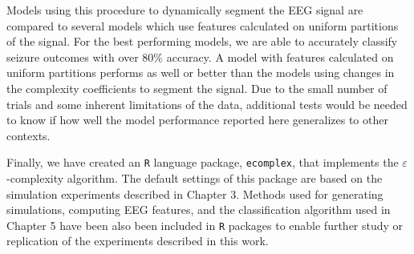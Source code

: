 Models using this procedure to dynamically segment the EEG signal
are compared to several models which use features calculated on uniform partitions of the signal. 
For the best performing models, we are able to accurately classify 
seizure outcomes with over 80\% accuracy. A model with features calculated on uniform partitions performs 
as well or better than the models using changes in the complexity
coefficients to segment the signal.
Due to the small number of trials and some inherent limitations 
of the data, additional tests would be needed to 
know if how well the model performance reported here generalizes
to other contexts.


Finally, we have created an \texttt{R} language package, 
\texttt{ecomplex}, that implements 
the $\varepsilon$-complexity algorithm. The 
default settings of this package are based on the simulation 
experiments described in Chapter 3. Methods used 
for generating simulations, computing EEG features, 
and the classification algorithm used in Chapter 5 
have been also been included in \texttt{R} 
packages to enable further study or replication of
the experiments described in this work.


